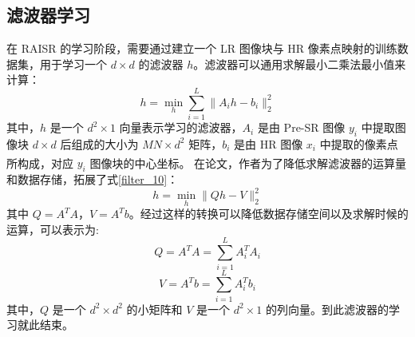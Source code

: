\documentclass[12pt, a4paper, oneside]{ctexbook}
\begin{document}
	\subsection{滤波器学习}
	在 RAISR 的学习阶段，需要通过建立一个 LR 图像块与 HR 像素点映射的训练数据集，用于学习一个 $d\times d$ 的滤波器 $h$。滤波器可以通用求解最小二乘法最小值来计算：
	\begin{equation}
h=\min_h\sum_{i=1}^L\lVert{A_ih-b_i}\rVert_2^2 \label{filter_10}
	\end{equation} 
	其中，$h$ 是一个 $d^2 \times 1$ 向量表示学习的滤波器，$A_i$ 是由 Pre-SR 图像 $y_i$ 中提取图像块 $d\times d$ 后组成的大小为 $MN\times d^2$ 矩阵，$b_i$ 是由 HR 图像 $x_i$ 中提取的像素点所构成，对应 $y_i$ 图像块的中心坐标。
	在论文\textsuperscript{\cite{1}}，作者为了降低求解滤波器的运算量和数据存储，拓展了式\ref{filter_10}：
	\begin{equation}
h=\min_h\lVert Qh-V\rVert_2^2		\label{filter_11}
	\end{equation}
	其中 $Q=A^TA$，$V=A^Tb$。经过这样的转换可以降低数据存储空间以及求解时候的运算，可以表示为:
	\begin{equation}
Q=A^TA=\sum_{i=1}^LA_i^TA_i
	\end{equation}
	\begin{equation}
V=A^Tb=\sum_{i=1}^LA_i^Tb_i
	\end{equation}
其中，$Q$ 是一个 $d^2 \times d^2$ 的小矩阵和 $V$ 是一个 $d^2 \times 1$ 的列向量。到此滤波器的学习就此结束。
\end{document}
